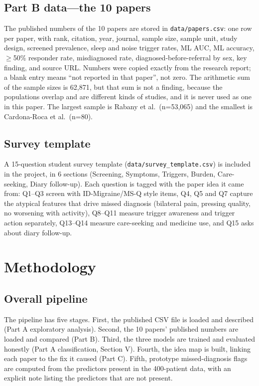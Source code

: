 \documentclass[conference]{IEEEtran}
\begin{document}
\subsection{Part B data---the 10 papers}
The published numbers of the 10 papers are stored in \texttt{data/papers.csv}: one row per paper, with rank, citation, year, journal, sample size, sample unit, study design, screened prevalence, sleep and noise trigger rates, ML AUC, ML accuracy, $\geq$50\% responder rate, misdiagnosed rate, diagnosed-before-referral by sex, key finding, and source URL. Numbers were copied exactly from the research report; a blank entry means ``not reported in that paper'', not zero. The arithmetic sum of the sample sizes is 62,871, but that sum is not a finding, because the populations overlap and are different kinds of studies, and it is never used as one in this paper. The largest sample is Rabany et al.\ (n=53,065) and the smallest is Cardona-Roca et al.\ (n=80).

\subsection{Survey template}
A 15-question student survey template (\texttt{data/survey\_template.csv}) is included in the project, in 6 sections (Screening, Symptoms, Triggers, Burden, Care-seeking, Diary follow-up). Each question is tagged with the paper idea it came from: Q1--Q3 screen with ID-Migraine/MS-Q style items, Q4, Q5 and Q7 capture the atypical features that drive missed diagnosis (bilateral pain, pressing quality, no worsening with activity), Q8--Q11 measure trigger awareness and trigger action separately, Q13--Q14 measure care-seeking and medicine use, and Q15 asks about diary follow-up.

\section{Methodology}
\subsection{Overall pipeline}
The pipeline has five stages. First, the published CSV file is loaded and described (Part A exploratory analysis). Second, the 10 papers' published numbers are loaded and compared (Part B). Third, the three models are trained and evaluated honestly (Part A classification, Section V). Fourth, the idea map is built, linking each paper to the fix it caused (Part C). Fifth, prototype missed-diagnosis flags are computed from the predictors present in the 400-patient data, with an explicit note listing the predictors that are not present.
\end{document}
